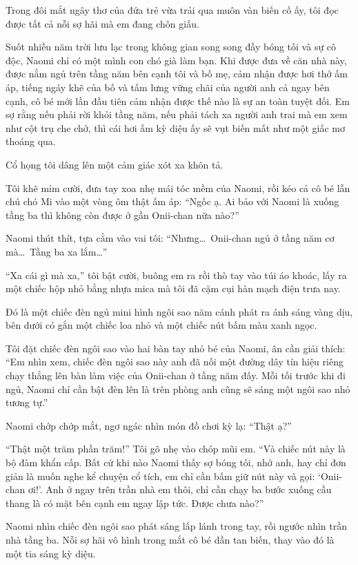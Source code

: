 \documentclass[../main.tex]{subfiles}
\begin{document}
Trong đôi mắt ngây thơ của đứa trẻ vừa trải qua muôn vàn biến cố ấy, tôi đọc được tất cả nỗi sợ hãi mà em đang chôn giấu.

Suốt nhiều năm trời lưu lạc trong không gian song song đầy bóng tối và sự cô độc, Naomi chỉ có một mình con chó già làm bạn. Khi được đưa về căn nhà này, được nằm ngủ trên tầng năm bên cạnh tôi và bố mẹ, cảm nhận được hơi thở ấm áp, tiếng ngáy khẽ của bố và tấm lưng vững chãi của người anh cả ngay bên cạnh, cô bé mới lần đầu tiên cảm nhận được thế nào là sự an toàn tuyệt đối. Em sợ rằng nếu phải rời khỏi tầng năm, nếu phải tách xa người anh trai mà em xem như cột trụ che chở, thì cái hơi ấm kỳ diệu ấy sẽ vụt biến mất như một giấc mơ thoáng qua.

Cổ họng tôi dâng lên một cảm giác xót xa khôn tả.

Tôi khẽ mỉm cười, đưa tay xoa nhẹ mái tóc mềm của Naomi, rồi kéo cả cô bé lẫn chú chó Mi vào một vòng ôm thật ấm áp: ``Ngốc ạ. Ai bảo với Naomi là xuống tầng ba thì không còn được ở gần Onii-chan nữa nào?''

Naomi thút thít, tựa cằm vào vai tôi: ``Nhưng\dots\ Onii-chan ngủ ở tầng năm cơ mà\dots\ Tầng ba xa lắm\dots''

``Xa cái gì mà xa,'' tôi bật cười, buông em ra rồi thò tay vào túi áo khoác, lấy ra một chiếc hộp nhỏ bằng nhựa mica mà tôi đã cặm cụi hàn mạch điện trưa nay.

Đó là một chiếc đèn ngủ mini hình ngôi sao năm cánh phát ra ánh sáng vàng dịu, bên dưới có gắn một chiếc loa nhỏ và một chiếc nút bấm màu xanh ngọc.

Tôi đặt chiếc đèn ngôi sao vào hai bàn tay nhỏ bé của Naomi, ân cần giải thích: ``Em nhìn xem, chiếc đèn ngôi sao này anh đã nối một đường dây tín hiệu riêng chạy thẳng lên bàn làm việc của Onii-chan ở tầng năm đấy. Mỗi tối trước khi đi ngủ, Naomi chỉ cần bật đèn lên là trên phòng anh cũng sẽ sáng một ngôi sao nhỏ tương tự.''

Naomi chớp chớp mắt, ngơ ngác nhìn món đồ chơi kỳ lạ: ``Thật ạ?''

``Thật một trăm phần trăm!'' Tôi gõ nhẹ vào chóp mũi em. ``Và chiếc nút này là bộ đàm khẩn cấp. Bất cứ khi nào Naomi thấy sợ bóng tối, nhớ anh, hay chỉ đơn giản là muốn nghe kể chuyện cổ tích, em chỉ cần bấm giữ nút này và gọi: `Onii-chan ơi!'. Anh ở ngay trên trần nhà em thôi, chỉ cần chạy ba bước xuống cầu thang là có mặt bên cạnh em ngay lập tức. Được chưa nào?''

Naomi nhìn chiếc đèn ngôi sao phát sáng lấp lánh trong tay, rồi ngước nhìn trần nhà tầng ba. Nỗi sợ hãi vô hình trong mắt cô bé dần tan biến, thay vào đó là một tia sáng kỳ diệu.
\end{document}
